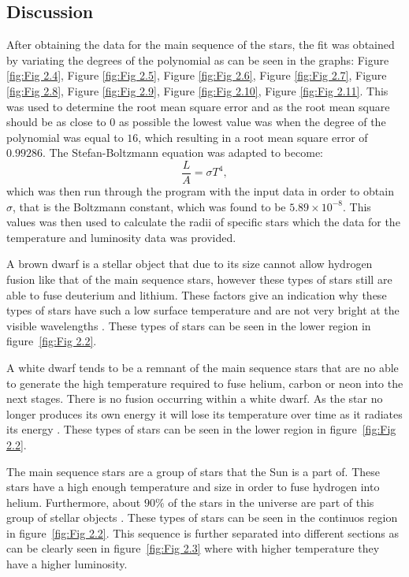 \documentclass[12pt, a4paper]{article}
\begin{document}
\subsection{Discussion}
After obtaining the data for the main sequence of the stars, the fit was obtained by variating the degrees of the polynomial as can be seen in the graphs: Figure \ref{fig:Fig 2.4}, Figure \ref{fig:Fig 2.5}, Figure \ref{fig:Fig 2.6}, Figure \ref{fig:Fig 2.7}, Figure \ref{fig:Fig 2.8}, Figure \ref{fig:Fig 2.9}, Figure \ref{fig:Fig 2.10}, Figure \ref{fig:Fig 2.11}. This was used to determine the root mean square error and as the root mean square should be as close to 0 as possible the lowest value was when the degree of the polynomial was equal to \(16\), which resulting in a root mean square error of \(0.99286\). The Stefan-Boltzmann equation was adapted to become:
\begin{equation}
    \frac{L}{A} = \sigma T^4 ,
\end{equation}
which was then run through the program with the input data in order to obtain \(\sigma\), that is the Boltzmann constant, which was found to be \(5.89 \times 10^{-8}\). This values was then used to calculate the radii of specific stars which the data for the temperature and luminosity data was provided.

A brown dwarf is a stellar object that due to its size cannot allow hydrogen fusion like that of the main sequence stars, however these types of stars still are able to fuse deuterium and lithium. These factors give an indication why these types of stars have such a low surface temperature and are not very bright at the visible wavelengths \parencite{jaschek1990classification}. These types of stars can be seen in the lower region in figure~\ref{fig:Fig 2.2}.

A white dwarf tends to be a remnant of the main sequence stars that are no able to generate the high temperature required to fuse helium, carbon or neon into the next stages. There is no fusion occurring within a white dwarf. As the star no longer produces its own energy it will lose its temperature over time as it radiates its energy \parencite{hoyle1955evolution}. These types of stars can be seen in the lower region in figure~\ref{fig:Fig 2.2}.

The main sequence stars are a group of stars that the Sun is a part of. These stars have a high enough temperature and size in order to fuse hydrogen into helium. Furthermore, about \(90\%\) of the stars in the universe are part of this group of stellar objects \parencite{jaschek1990classification}. These types of stars can be seen in the continuos region in figure~\ref{fig:Fig 2.2}. This sequence is further separated into different sections as can be clearly seen in figure~\ref{fig:Fig 2.3} where with higher temperature they have a higher luminosity.
\end{document}
